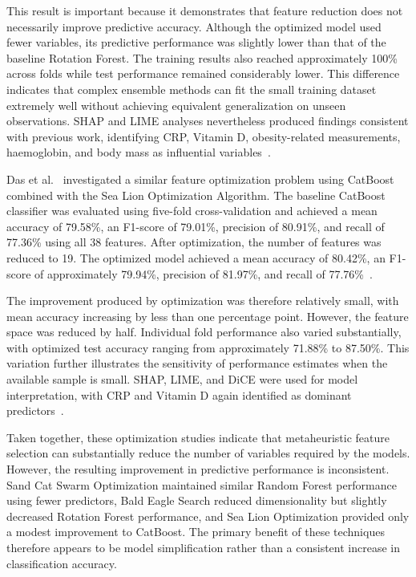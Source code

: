 This result is important because it demonstrates that feature reduction does not necessarily improve predictive accuracy. Although the optimized model used fewer variables, its predictive performance was slightly lower than that of the baseline Rotation Forest. The training results also reached approximately 100\% across folds while test performance remained considerably lower. This difference indicates that complex ensemble methods can fit the small training dataset extremely well without achieving equivalent generalization on unseen observations. SHAP and LIME analyses nevertheless produced findings consistent with previous work, identifying CRP, Vitamin D, obesity-related measurements, haemoglobin, and body mass as influential variables~\cite{shrestha2026metaheuristic}.

Das et al.~\cite{das2026sloa} investigated a similar feature optimization problem using CatBoost combined with the Sea Lion Optimization Algorithm. The baseline CatBoost classifier was evaluated using five-fold cross-validation and achieved a mean accuracy of 79.58\%, an F1-score of 79.01\%, precision of 80.91\%, and recall of 77.36\% using all 38 features. After optimization, the number of features was reduced to 19. The optimized model achieved a mean accuracy of 80.42\%, an F1-score of approximately 79.94\%, precision of 81.97\%, and recall of 77.76\%~\cite{das2026sloa}.

The improvement produced by optimization was therefore relatively small, with mean accuracy increasing by less than one percentage point. However, the feature space was reduced by half. Individual fold performance also varied substantially, with optimized test accuracy ranging from approximately 71.88\% to 87.50\%. This variation further illustrates the sensitivity of performance estimates when the available sample is small. SHAP, LIME, and DiCE were used for model interpretation, with CRP and Vitamin D again identified as dominant predictors~\cite{das2026sloa}.

Taken together, these optimization studies indicate that metaheuristic feature selection can substantially reduce the number of variables required by the models. However, the resulting improvement in predictive performance is inconsistent. Sand Cat Swarm Optimization maintained similar Random Forest performance using fewer predictors, Bald Eagle Search reduced dimensionality but slightly decreased Rotation Forest performance, and Sea Lion Optimization provided only a modest improvement to CatBoost. The primary benefit of these techniques therefore appears to be model simplification rather than a consistent increase in classification accuracy.

